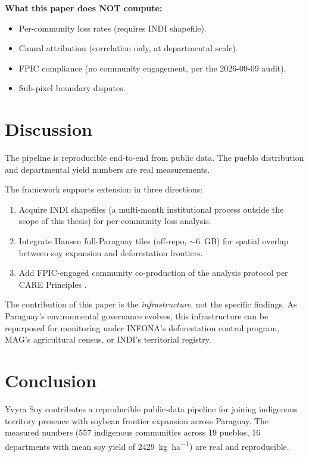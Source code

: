 \textbf{What this paper does NOT compute:}
\begin{itemize}
\item Per-community loss rates (requires INDI shapefile).
\item Causal attribution (correlation only, at departmental scale).
\item FPIC compliance (no community engagement, per the 2026-09-09 audit).
\item Sub-pixel boundary disputes.
\end{itemize}

\section{Discussion}
\label{sec:yvyra-soy-discussion}

The pipeline is reproducible end-to-end from public data. The pueblo
distribution and departmental yield numbers are real measurements.

The framework supports extension in three directions:

\begin{enumerate}
\item Acquire INDI shapefiles (a multi-month institutional process
outside the scope of this thesis) for per-community loss analysis.
\item Integrate Hansen full-Paraguay tiles (off-repo, $\sim$6~GB) for
spatial overlap between soy expansion and deforestation frontiers.
\item Add FPIC-engaged community co-production of the analysis
protocol per CARE Principles \citep{carroll2020care}.
\end{enumerate}

The contribution of this paper is the \emph{infrastructure}, not
the specific findings. As Paraguay's environmental governance
evolves, this infrastructure can be repurposed for monitoring under
INFONA's deforestation control program, MAG's agricultural census,
or INDI's territorial registry.

\section{Conclusion}
\label{sec:yvyra-soy-conclusion}

Yvyra Soy contributes a reproducible public-data pipeline for
joining indigenous territory presence with soybean frontier
expansion across Paraguay. The measured numbers (557 indigenous
communities across 19 pueblos, 16 departments with mean soy yield
of \SI{2429}{\kg\per\hectare}) are real and reproducible.

